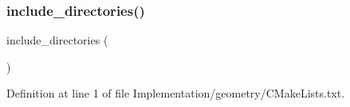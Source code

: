 \subsubsection{\texorpdfstring{include\+\_\+directories()}{include\_directories()}}
{\footnotesize\ttfamily include\+\_\+directories (\begin{DoxyParamCaption}\item[{\char`\"{}\$\{P\+R\+O\+J\+E\+C\+T\+\_\+\+S\+O\+U\+R\+C\+E\+\_\+\+D\+IR\}/Implementation/geometry/Coordinates\char`\"{} \char`\"{}\$\{P\+R\+O\+J\+E\+C\+T\+\_\+\+S\+O\+U\+R\+C\+E\+\_\+\+D\+IR\}/Implementation/geometry/Coordinates/common\char`\"{} \char`\"{}\$\{P\+R\+O\+J\+E\+C\+T\+\_\+\+S\+O\+U\+R\+C\+E\+\_\+\+D\+IR\}/Implementation/geometry/Coordinates/1\+D\char`\"{} \char`\"{}\$\{\+P\+R\+O\+J\+E\+C\+T\+\_\+\+S\+O\+U\+R\+C\+E\+\_\+\+D\+I\+R\}/\+Implementation/geometry/\+Coordinates/2\+D\char`\"{} \char`\"{}\$\{\+P\+R\+O\+J\+E\+C\+T\+\_\+\+S\+O\+U\+R\+C\+E\+\_\+\+D\+I\+R\}/\+Implementation/geometry/\+Coordinates/3\+D\char`\"{}}]{ }\end{DoxyParamCaption})}



Definition at line 1 of file Implementation/geometry/\+C\+Make\+Lists.\+txt.


